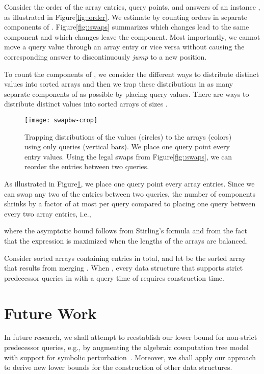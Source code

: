 \documentclass[orivec]{llncs}
\begin{document}
Consider the order of the array entries, query points, and answers of an instance , as illustrated in Figure\nobreakspace \ref {fig::order}. We estimate  by counting orders in separate components of .  Figure\nobreakspace \ref {fig::swaps} summarizes which changes lead to the same component and which changes leave the component. Most importantly, we cannot move a query value through an array entry or vice versa without causing the corresponding answer to discontinuously \emph{jump} to a new position. 

To count the components of , we consider the different ways to distribute  distinct values  into sorted arrays  and then we trap these distributions in as many separate components of  as possible by placing query values. There are  ways to distribute  distinct values into  sorted arrays of sizes .
\begin{figure}[ht]
	\centering \vspace{-\baselineskip}
	\texttt{[image: swapbw-crop]}
	\caption{Trapping distributions of the values (circles) to the arrays (colors) using only  queries (vertical bars). We place one query point every  entry values. Using the legal swaps from Figure\nobreakspace \ref {fig::swaps}, we can reorder the entries between two queries. \label{fig::trapmany}} \vspace{-\baselineskip}
\end{figure}

As illustrated in Figure\nobreakspace \ref {fig::trapmany}, we place one query point every  array entries. Since we can swap any two of the  entries between two queries, the number of components shrinks by a factor of at most  per query compared to placing one query between every two array entries, i.e.,
 
where the asymptotic bound follows from Stirling's formula and from the fact that the expression is maximized when the lengths of the arrays are balanced.
\begin{theorem} Consider  sorted arrays  containing  entries in total, and let  be the sorted array that results from merging . 
When , every data structure that supports strict predecessor queries in  with a query time of  requires  construction time. 
\end{theorem}


\section{Future Work} \label{sec::conclusion}



In future research, we shall attempt to reestablish our lower bound for non-strict predecessor queries, e.g., by augmenting the algebraic computation tree model with support for symbolic perturbation~\cite{emiris1995general}. Moreover, we shall apply our approach to derive new lower bounds for the construction of other data structures.
 

{}

\end{document}
